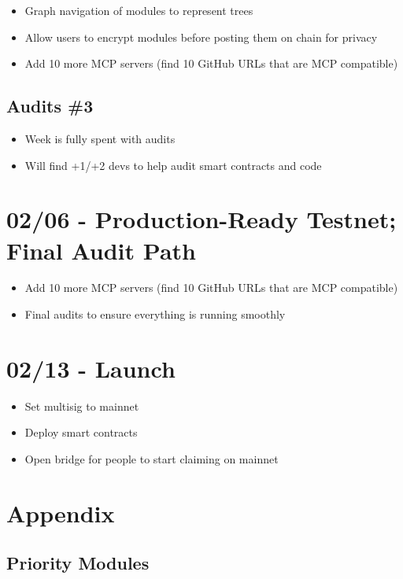 \documentclass{article}
\begin{document}
\begin{itemize}[leftmargin=*]
    \item Graph navigation of modules to represent trees
    \item Allow users to encrypt modules before posting them on chain for privacy
    \item Add 10 more MCP servers (find 10 GitHub URLs that are MCP compatible)
\end{itemize}

\subsection{Audits \#3}
\begin{itemize}[leftmargin=*]
    \item Week is fully spent with audits
    \item Will find +1/+2 devs to help audit smart contracts and code
\end{itemize}

\section{02/06 - Production-Ready Testnet; Final Audit Path}

\begin{itemize}[leftmargin=*]
    \item Add 10 more MCP servers (find 10 GitHub URLs that are MCP compatible)
    \item Final audits to ensure everything is running smoothly
\end{itemize}

\section{02/13 - Launch}

\begin{itemize}[leftmargin=*]
    \item Set multisig to mainnet
    \item Deploy smart contracts
    \item Open bridge for people to start claiming on mainnet
\end{itemize}

\section{Appendix}

\subsection{Priority Modules}
\end{document}
